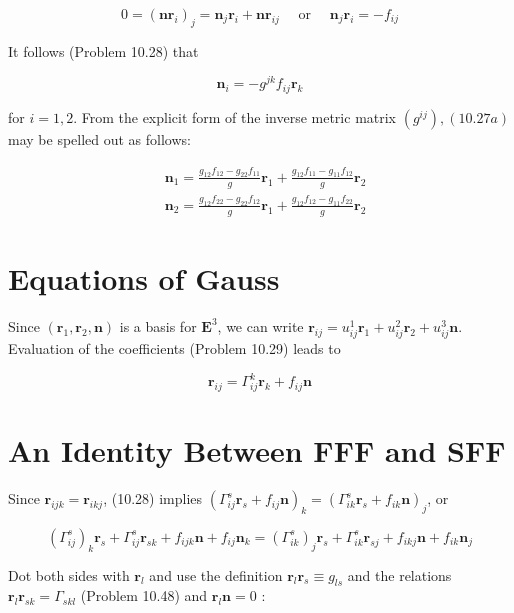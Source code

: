 \documentclass[10pt]{article}
\begin{document}
$$
0=\left(\mathbf{n r}_{i}\right)_{j}=\mathbf{n}_{j} \mathbf{r}_{i}+\mathbf{n} \mathbf{r}_{i j} \quad \text { or } \quad \mathbf{n}_{j} \mathbf{r}_{i}=-f_{i j}
$$

It follows (Problem 10.28) that


\begin{equation*}
\mathbf{n}_{i}=-g^{j k} f_{i j} \mathbf{r}_{k} \tag{10.27a}
\end{equation*}


for $i=1,2$. From the explicit form of the inverse metric matrix $\left(g^{i j}\right),(10.27 a)$ may be spelled out as follows:


\begin{align*}
& \mathbf{n}_{1}=\frac{g_{12} f_{12}-g_{22} f_{11}}{g} \mathbf{r}_{1}+\frac{g_{12} f_{11}-g_{11} f_{12}}{g} \mathbf{r}_{2} \\
& \mathbf{n}_{2}=\frac{g_{12} f_{22}-g_{22} f_{12}}{g} \mathbf{r}_{1}+\frac{g_{12} f_{12}-g_{11} f_{22}}{g} \mathbf{r}_{2} \tag{10.27b}
\end{align*}


\section*{Equations of Gauss}
Since $\left(\mathbf{r}_{1}, \mathbf{r}_{2}, \mathbf{n}\right)$ is a basis for $\mathbf{E}^{3}$, we can write $\mathbf{r}_{i j}=u_{i j}^{1} \mathbf{r}_{1}+u_{i j}^{2} \mathbf{r}_{2}+u_{i j}^{3} \mathbf{n}$. Evaluation of the coefficients (Problem 10.29) leads to


\begin{equation*}
\mathbf{r}_{i j}=\Gamma_{i j}^{k} \mathbf{r}_{k}+f_{i j} \mathbf{n} \tag{10.28}
\end{equation*}


\section*{An Identity Between FFF and SFF}
Since $\mathbf{r}_{i j k}=\mathbf{r}_{i k j}$, (10.28) implies $\left(\Gamma_{i j}^{s} \mathbf{r}_{s}+f_{i j} \mathbf{n}\right)_{k}=\left(\Gamma_{i k}^{s} \mathbf{r}_{s}+f_{i k} \mathbf{n}\right)_{j}$, or

$$
\left(\Gamma_{i j}^{s}\right)_{k} \mathbf{r}_{s}+\Gamma_{i j}^{s} \mathbf{r}_{s k}+f_{i j k} \mathbf{n}+f_{i j} \mathbf{n}_{k}=\left(\Gamma_{i k}^{s}\right)_{j} \mathbf{r}_{s}+\Gamma_{i k}^{s} \mathbf{r}_{s j}+f_{i k j} \mathbf{n}+f_{i k} \mathbf{n}_{j}
$$

Dot both sides with $\mathbf{r}_{l}$ and use the definition $\mathbf{r}_{l} \mathbf{r}_{s} \equiv g_{l s}$ and the relations $\mathbf{r}_{l} \mathbf{r}_{s k}=\Gamma_{s k l}$ (Problem 10.48) and $\mathbf{r}_{l} \mathbf{n}=0$ :
\end{document}
